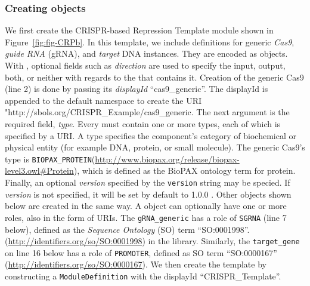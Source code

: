 \subsubsection*{Creating  objects}
We first create the CRISPR-based Repression Template module shown in
Figure~\ref{fig:fig-CRPb}. In this template, we include definitions
for generic \emph{Cas9}, \emph{guide RNA} (gRNA), and \emph{target}
DNA  instances. They are encoded as
 objects. With , optional fields such as \emph{direction} are used to specify the input, output, both, or neither with regards to the  that contains it. Creation of the generic Cas9 (line
2)  is done by passing its \emph{displayId}
``cas9\_generic''.  The displayId is appended to the default namespace to create the URI "http://sbols.org/CRISPR\_Example/cas9\_generic.  The next argument is the required field, 
\emph{type}. Every  must contain one or more
types, each of which is specified by a URI. A type specifies the
component's category of biochemical or physical entity (for example
DNA, protein, or small molecule). The generic Cas9's type is
\lstinline+BIOPAX_PROTEIN+(\url{http://www.biopax.org/release/biopax-level3.owl\#Protein}), which is defined as the BioPAX ontology term for
protein.  Finally, an optional \emph{version} specified by the \lstinline+version+
string may be specied. If \emph{version} is not specified, it will be set by default to 1.0.0
. Other
 objects shown below are created in the same
way. A  object can optionally have one or
more roles, also in the form of URIs. The \lstinline+gRNA_generic+ has
a role of \lstinline+SGRNA+ (line 7 below), defined as the
\emph{Sequence Ontology} (SO) term ``SO:0001998''.
(\url{http://identifiers.org/so/SO:0001998}) in the
library. Similarly, the \lstinline+target_gene+ on line 16 below has a role of
\lstinline+PROMOTER+, defined as SO term ``SO:0000167''
(\url{http://identifiers.org/so/SO:0000167}). We then create the  template by constructing a \lstinline+ModuleDefinition+ with the displayId ``CRISPR\_Template''.

